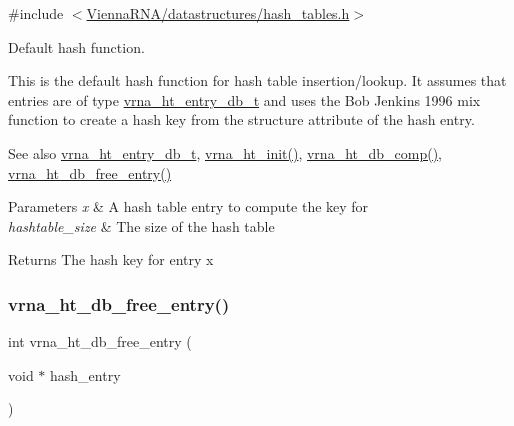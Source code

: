 {\ttfamily \#include $<$\mbox{\hyperlink{hash__tables_8h}{Vienna\+R\+N\+A/datastructures/hash\+\_\+tables.\+h}}$>$}



Default hash function. 

This is the default hash function for hash table insertion/lookup. It assumes that entries are of type \mbox{\hyperlink{group__hash__table__utils_structvrna__ht__entry__db__t}{vrna\+\_\+ht\+\_\+entry\+\_\+db\+\_\+t}} and uses the Bob Jenkins 1996 mix function to create a hash key from the {\ttfamily structure} attribute of the hash entry.

\begin{DoxySeeAlso}{See also}
\mbox{\hyperlink{group__hash__table__utils_structvrna__ht__entry__db__t}{vrna\+\_\+ht\+\_\+entry\+\_\+db\+\_\+t}}, \mbox{\hyperlink{group__hash__table__utils_ga37d1c7e13087a2b7c1b87fda34577c29}{vrna\+\_\+ht\+\_\+init()}}, \mbox{\hyperlink{group__hash__table__utils_gac4ec0b8372d50d7347a63f140f340962}{vrna\+\_\+ht\+\_\+db\+\_\+comp()}}, \mbox{\hyperlink{group__hash__table__utils_gabcdcd0d070b3dfd2634a09e7838acf66}{vrna\+\_\+ht\+\_\+db\+\_\+free\+\_\+entry()}}
\end{DoxySeeAlso}

\begin{DoxyParams}{Parameters}
{\em x} & A hash table entry to compute the key for \\
\hline
{\em hashtable\+\_\+size} & The size of the hash table \\
\hline
\end{DoxyParams}
\begin{DoxyReturn}{Returns}
The hash key for entry {\ttfamily x} 
\end{DoxyReturn}
\mbox{\label{group__hash__table__utils_gabcdcd0d070b3dfd2634a09e7838acf66}} 
\subsubsection{\texorpdfstring{vrna\_ht\_db\_free\_entry()}{vrna\_ht\_db\_free\_entry()}}
{\footnotesize\ttfamily int vrna\+\_\+ht\+\_\+db\+\_\+free\+\_\+entry (\begin{DoxyParamCaption}\item[{void $\ast$}]{hash\+\_\+entry }\end{DoxyParamCaption})}



